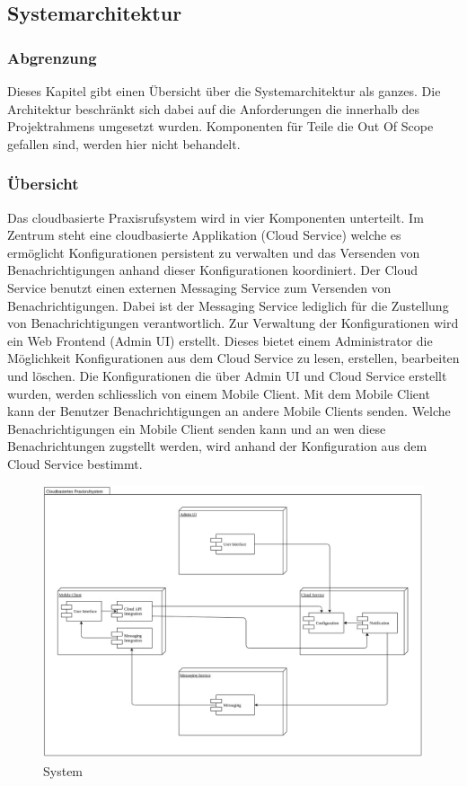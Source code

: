 \subsection{Systemarchitektur}\label{subsec:systemarchitektur}
\subsubsection*{Abgrenzung}

Dieses Kapitel gibt einen Übersicht über die Systemarchitektur als ganzes. Die Architektur beschränkt sich dabei auf die
Anforderungen die innerhalb des Projektrahmens umgesetzt wurden. Komponenten für Teile die Out Of Scope gefallen sind,
werden hier nicht behandelt.

\subsubsection*{Übersicht}

Das cloudbasierte Praxisrufsystem wird in vier Komponenten unterteilt.
Im Zentrum steht eine cloudbasierte Applikation (Cloud Service) welche es ermöglicht Konfigurationen persistent zu verwalten und das Versenden von Benachrichtigungen anhand dieser Konfigurationen koordiniert.
Der Cloud Service benutzt einen externen Messaging Service zum Versenden von Benachrichtigungen. Dabei ist der Messaging Service lediglich für die Zustellung von Benachrichtigungen verantwortlich.
Zur Verwaltung der Konfigurationen wird ein Web Frontend (Admin UI) erstellt. Dieses bietet einem Administrator die Möglichkeit Konfigurationen aus dem Cloud Service zu lesen, erstellen, bearbeiten und löschen.
Die Konfigurationen die über Admin UI und Cloud Service erstellt wurden, werden schliesslich von einem Mobile Client. Mit dem Mobile Client kann der Benutzer Benachrichtigungen an andere Mobile Clients senden.
Welche Benachrichtigungen ein Mobile Client senden kann und an wen diese Benachrichtungen zugstellt werden, wird anhand der Konfiguration aus dem Cloud Service bestimmt.

\begin{figure}[h]
    \centering
    \begin{minipage}[b]{1.0\textwidth}
        \includegraphics[width=\textwidth]{graphics/Component_System}
        \caption{System}
    \end{minipage}
\end{figure}

\clearpage
